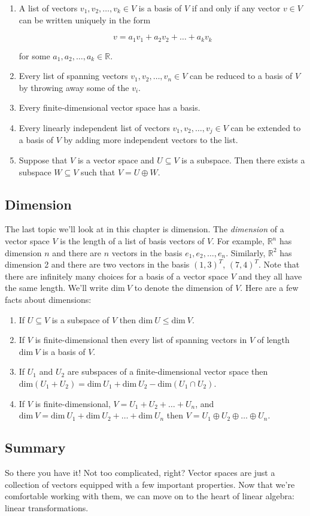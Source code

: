 \documentclass[12pt]{article}
\begin{document}
\begin{enumerate}
\item A list of vectors $v_1, v_2, \ldots, v_k \in V$ is a basis of $V$ if and only if any vector $v \in V$ can be written uniquely in the form

$$v = a_1 v_1 + a_2 v_2 + \ldots + a_k v_k$$

for some $a_1, a_2, \ldots, a_k \in \mathbb{R}$.
\item Every list of spanning vectors $v_1, v_2, \ldots, v_n \in V$ can be reduced to a basis of $V$ by throwing away some of the $v_i$.

\item Every finite-dimensional vector space has a basis.

\item Every linearly independent list of vectors $v_1, v_2, \ldots, v_j \in V$ can be extended to a basis of $V$ by adding more independent vectors to the list.

\item Suppose that $V$ is a vector space and $U \subseteq V$ is a subspace. Then there exists a subspace $W \subseteq V$ such that $V = U \oplus W$.
\end{enumerate}

\subsection*{Dimension}

The last topic we'll look at in this chapter is dimension. The \textit{dimension} of a vector space $V$ is the length of a list of basis vectors of $V$. For example, $\mathbb{R}^n$ has dimension $n$ and there are $n$ vectors in the basis $e_1, e_2, \ldots, e_n$. Similarly, $\mathbb{R}^2$ has dimension 2 and there are two vectors in the basis $(1, 3)^T$, $(7,4)^T$. Note that there are infinitely many choices for a basis of a vector space $V$ and they all have the same length. We'll write $\textrm{dim} \: V$ to denote the dimension of $V$. Here are a few facts about dimensions:

\begin{enumerate}
\item If $U \subseteq V$ is a subspace of $V$ then $\textrm{dim} \: U \leq \textrm{dim} \: V$.
\item If $V$ is finite-dimensional then every list of spanning vectors in $V$ of length $\textrm{dim} \: V$ is a basis of $V$.
\item If $U_1$ and $U_2$ are subspaces of a finite-dimensional vector space then $\textrm{dim} (U_1 + U_2) = \textrm{dim} \: U_1 + \textrm{dim} \: U_2 - \textrm{dim}( U_1 \cap U_2)$.
\item If $V$ is finite-dimensional, $V = U_1 + U_2 + \ldots + U_n$, and $\textrm{dim} \: V = \textrm{dim} \: U_1 + \textrm{dim} \: U_2 + \ldots + \textrm{dim} \: U_n$ then $V = U_1 \oplus U_2 \oplus \ldots \oplus U_n$.
\end{enumerate}


\subsection*{Summary}

So there you have it! Not too complicated, right? Vector spaces are just a collection of vectors equipped with a few important properties. Now that we're comfortable working with them, we can move on to the heart of linear algebra:  linear transformations.
\end{document}
